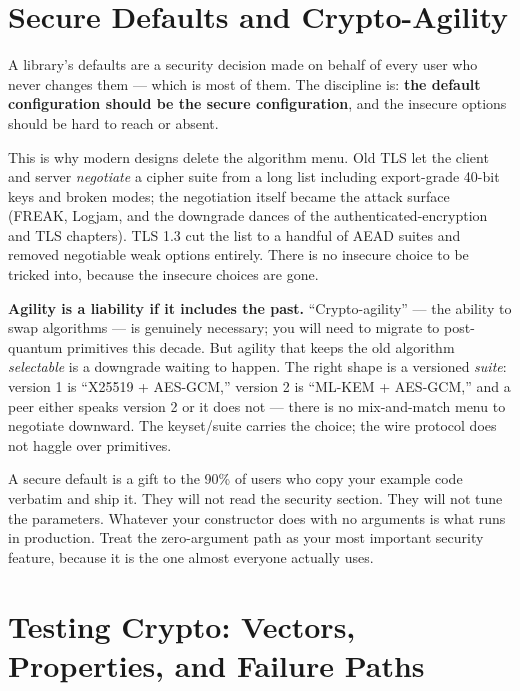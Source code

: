 \section{Secure Defaults and Crypto-Agility}
\label{ch39:defaults}

A library's defaults are a security decision made on behalf of every user who never
changes them --- which is most of them. The discipline is: \textbf{the default
configuration should be the secure configuration}, and the insecure options should
be hard to reach or absent.

This is why modern designs delete the algorithm menu. Old TLS let the client and
server \emph{negotiate} a cipher suite from a long list including export-grade
40-bit keys and broken modes; the negotiation itself became the attack surface
(FREAK, Logjam, and the downgrade dances of the authenticated-encryption and TLS
chapters). TLS 1.3 cut the list to a handful of AEAD suites and removed negotiable
weak options entirely. There is no insecure choice to be tricked into, because the
insecure choices are gone.

\begin{trapbox}
\textbf{Agility is a liability if it includes the past.} ``Crypto-agility'' --- the
ability to swap algorithms --- is genuinely necessary; you will need to migrate to
post-quantum primitives this decade. But agility that keeps the old algorithm
\emph{selectable} is a downgrade waiting to happen. The right shape is a versioned
\emph{suite}: version 1 is ``X25519 + AES-GCM,'' version 2 is ``ML-KEM + AES-GCM,''
and a peer either speaks version 2 or it does not --- there is no mix-and-match menu
to negotiate downward. The keyset/suite carries the choice; the wire protocol does
not haggle over primitives.
\end{trapbox}

\begin{intuitionbox}
A secure default is a gift to the 90\% of users who copy your example code verbatim
and ship it. They will not read the security section. They will not tune the
parameters. Whatever your constructor does with no arguments is what runs in
production. Treat the zero-argument path as your most important security feature,
because it is the one almost everyone actually uses.
\end{intuitionbox}

\section{Testing Crypto: Vectors, Properties, and Failure Paths}
\label{ch39:testing}

